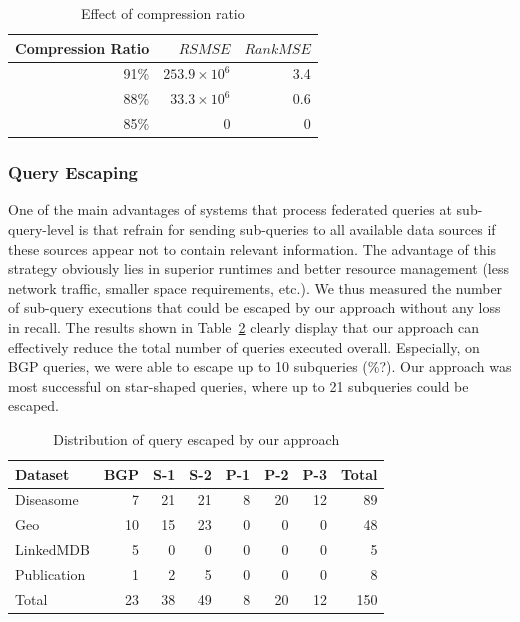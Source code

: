 \documentclass{sig-alternate}  %
\begin{document}
\begin{table}
\centering
\begin{tabular}{rrr}
\hline
Compression Ratio		& $RSMSE$	& $RankMSE$ \\\hline
91\%	& $253.9 \times 10^6$	& 3.4 \\
88\%	& $33.3 \times 10^6$	& 0.6 \\
85\%	& 0					&	0 \\\hline
\end{tabular}
\caption{Effect of compression ratio}
\label{tab:compression}
\end{table}

\subsubsection{Query Escaping}
One of the main advantages of systems that process federated queries at sub-query-level is that refrain for sending sub-queries to all available data sources if these sources appear not to contain relevant information. 
The advantage of this strategy obviously lies in superior runtimes and better resource management (less network traffic, smaller space requirements, etc.).
We thus measured the number of sub-query executions that could be escaped by our approach without any loss in recall. 
The results shown in Table~\ref{tab:escaped} clearly display that our approach can effectively reduce the total number of queries executed overall.
Especially, on BGP queries, we were able to escape up to 10 subqueries (\%?). 
Our approach was most successful on star-shaped queries, where up to 21 subqueries could be escaped. 

\begin{table}
\centering
\begin{tabular}{lrrrrrrr}
\hline
Dataset		&BGP 	&S-1&S-2&P-1&P-2&P-3&Total \\\hline
Diseasome				&7		&21	&21	&8	&20	&12	&89\\
Geo 	&10		&15	&23	&0	&0	&0	&48\\
LinkedMDB				&5		&0	&0	&0	&0	&0	&5\\
Publication			&1		&2	&5	&0	&0	&0	&8\\\hline
Total 					&23		&38	&49	&8	&20	&12	&150 \\\hline
\end{tabular}
\caption{Distribution of query escaped by our approach}
\label{tab:escaped}
\end{table}
\end{document}
